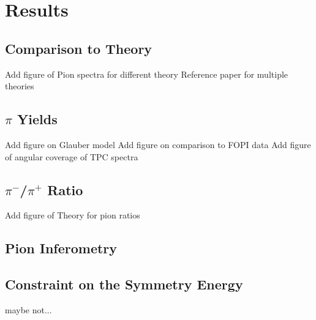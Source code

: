 \chapter{Results}
\section{Comparison to Theory}
Add figure of Pion spectra for different theory 
Reference paper for multiple theories 

\section{$\pi$ Yields}
Add figure on Glauber model 
Add figure on comparison to FOPI data
Add figure of angular coverage of TPC spectra 

\section{$\pi^-$/$\pi^+$ Ratio}
Add figure of Theory for pion ratios

\section{Pion Inferometry}

\section{Constraint on the Symmetry Energy}
maybe not...